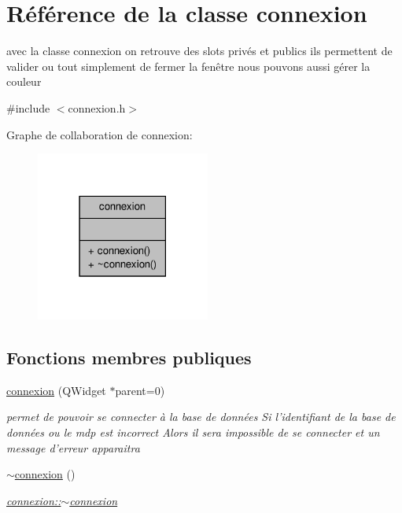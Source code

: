 \hypertarget{classconnexion}{\section{Référence de la classe connexion}
\label{classconnexion}
}


avec la classe connexion on retrouve des slots privés et publics ils permettent de valider ou tout simplement de fermer la fenêtre nous pouvons aussi gérer la couleur  




{\ttfamily \#include $<$connexion.\-h$>$}



Graphe de collaboration de connexion\-:\nopagebreak
\begin{figure}[H]
\begin{center}
\leavevmode
\includegraphics[width=162pt]{classconnexion__coll__graph}
\end{center}
\end{figure}
\subsection*{Fonctions membres publiques}
\begin{DoxyCompactItemize}
\item 
\hyperlink{classconnexion_a9764293a65b53a8385b6cc1d2ea14746}{connexion} (Q\-Widget $\ast$parent=0)
\begin{DoxyCompactList}\small\item\em permet de pouvoir se connecter à la base de données Si l'identifiant de la base de données ou le mdp est incorrect Alors il sera impossible de se connecter et un message d'erreur apparaitra \end{DoxyCompactList}\item 
\hyperlink{classconnexion_a28451b226398ff815107aa8a0fe4c673}{$\sim$connexion} ()
\begin{DoxyCompactList}\small\item\em \hyperlink{classconnexion_a28451b226398ff815107aa8a0fe4c673}{connexion\-::$\sim$connexion} \end{DoxyCompactList}\end{DoxyCompactItemize}


